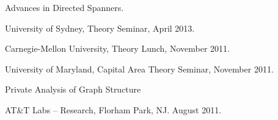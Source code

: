 \documentclass[11pt]{article}
\newenvironment{innerlist}[1][\enskip\textbullet]%
        {\begin{compactitem}[#1]}{\end{compactitem}}
\begin{document}
\begin{innerlist}
\item Advances in Directed Spanners.
\begin{innerlist}
\item University of Sydney, Theory Seminar, April 2013.
\item Carnegie-Mellon University, Theory Lunch, November 2011.
\item University of Maryland, Capital Area Theory Seminar, November 2011.
\end{innerlist}

\item Private Analysis of Graph Structure
\begin{innerlist}
  \item AT\&T Labs -- Research, Florham Park, NJ. August 2011.
\end{innerlist}

\begin{comment}
\item Introduction to Property Testing
\begin{innerlist}
\item St. Petersburg Department of V.A. Steklov Institute of Mathematics of the Russian Academy of Sciences. December 2012.
\item St. Petersburg Institute of Fine Mechanics and Optics. Theory Seminar. December 2012.
\end{innerlist}

\item \href{http://grigory.us/talsk/DPIntro.pptx}{Introduction to Differential Privacy} (based on slides by Adam D. Smith).
\begin{innerlist}
\item St. Petersburg Department of Steklov Institute of Mathematics, Computer Science Club, May 2011.
\end{innerlist}

\item Property Testing and Communication Complexity
\begin{innerlist}
\item Moscow State University. Kolmogorov Seminar. May 2011.
\end{innerlist}
\end{comment}


\end{innerlist}
\end{document}
